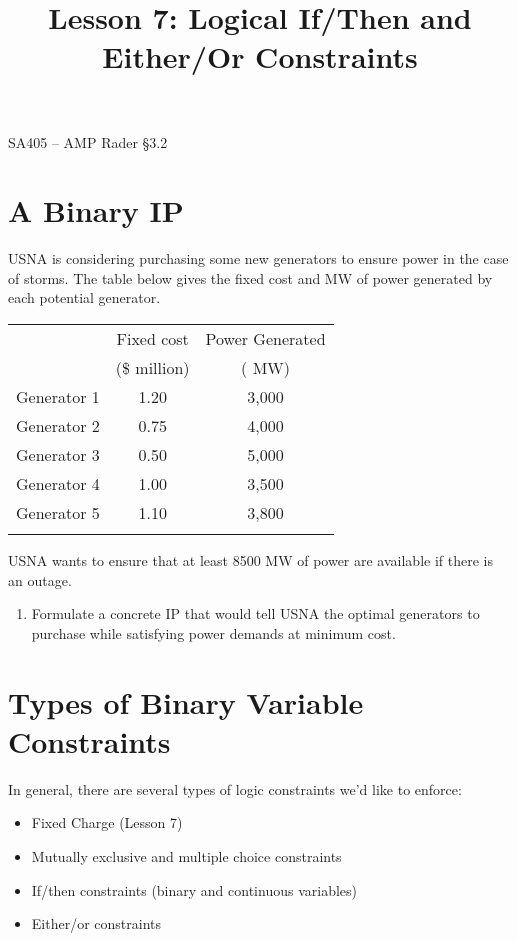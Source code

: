 \documentclass[11pt]{article}
\makeatletter
\theoremstyle{definition}
\renewcommand{\maketitle}{
  \noindent SA405 -- AMP \hfill Rader \S 3.2 \\

  \begin{center}\Large{\textbf{\@title}}\end{center}
}
\makeatother
\begin{document}
  
\title{Lesson 7: Logical If/Then and Either/Or Constraints}

\maketitle


\section{A Binary IP}

USNA is considering purchasing some new generators to ensure power in the case of storms. The table below gives the fixed cost and MW of power generated by each potential generator.

\begin{center}
\begin{tabular}{lcc} 
\hline 
 & Fixed cost & Power Generated \\
 & (\$ million) & ( MW) \\
\hline 
 Generator 1 & 1.20 & 3,000 \\ 
 Generator 2 & 0.75 & 4,000 \\ 
 Generator 3 & 0.50 & 5,000 \\ 
 Generator 4 & 1.00 & 3,500 \\
 Generator 5 & 1.10 & 3,800 \\
 \hline \\ 
\end{tabular}
\end{center}

USNA wants to ensure that at least 8500 MW of power are available if there is an outage. 

\begin{enumerate}
\item Formulate a concrete IP that would tell USNA the optimal generators to purchase while satisfying power demands at minimum cost.
\end{enumerate}

\newpage

\section{Types of Binary Variable Constraints}

In general, there are several types of logic constraints we'd like to enforce:
\begin{itemize}
\item Fixed Charge (Lesson 7)
\item Mutually exclusive and multiple choice constraints
\item If/then constraints (binary and continuous variables)
\item Either/or constraints
\end{itemize}
\end{document}

